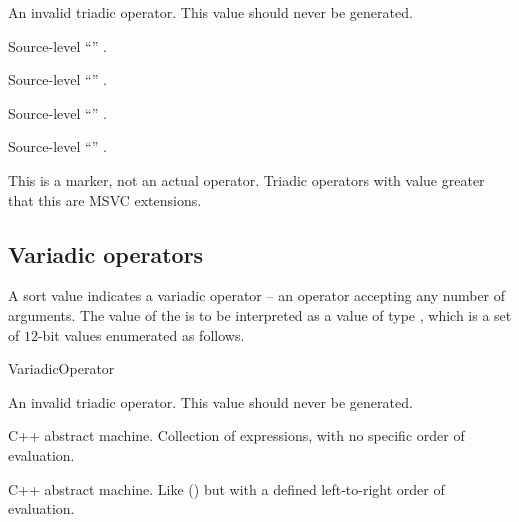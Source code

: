 An invalid triadic operator.  This value should never be generated.

Source-level ``'' .

Source-level ``'' .

Source-level ``'' .

Source-level ``'' .

This is a marker, not an actual operator. Triadic operators with 
value greater that this are MSVC extensions.

\subsection{Variadic operators}
\label{sec:ifc:OperatorSort:Variadic}

A sort value  indicates a variadic operator -- 
an operator accepting any number of arguments.  The
value of the  is to be interpreted as a value of type 
, which is a set of $12$-bit values enumerated as follows.
%
\begin{Enumeration}{VariadicOperator}

	\setcounter{enumi}{1023}
\end{Enumeration}


An invalid triadic operator.  This value should never be generated.


C++ abstract machine.  Collection of expressions, with no specific order of evaluation. 


C++ abstract machine.  Like  
() but with a defined left-to-right 
order of evaluation.

